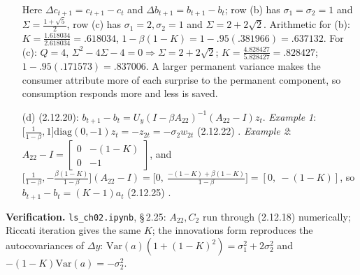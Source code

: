 \documentclass[12pt, letterpaper]{article}
\newcommand{\Var}{\mathrm{Var}}
\newcommand{\nb}[1]{\texttt{ls\_ch02.ipynb}, \S\,#1}
\begin{document}
\begin{tcolorbox}[oddbox,title={Exercise 2.25 \quad Consumption: the Two Classic Examples}]
\begin{enumerate}
\begin{center}
\begin{tabular}{@{}lcccccc@{}}
\bottomrule
\end{tabular}
\end{center}
Here $\Delta c_{t+1}=c_{t+1}-c_t$ and $\Delta b_{t+1}=b_{t+1}-b_t$; row (b) has $\sigma_1=\sigma_2=1$
and $\Sigma=\frac{1+\sqrt5}{2}$, row (c) has $\sigma_1=2,\sigma_2=1$ and $\Sigma=2+2\sqrt2$.
Arithmetic for (b): $K=\frac{1.618034}{2.618034}=.618034$, $1-\beta(1-K)=1-.95(.381966)=.637132$. For
(c): $Q=4$, $\Sigma^2-4\Sigma-4=0\Rightarrow\Sigma=2+2\sqrt2$; $K=\frac{4.828427}{5.828427}=.828427$;
$1-.95(.171573)=.837006$. A larger permanent variance makes the consumer attribute more of each
surprise to the permanent component, so consumption responds more and less is saved.
\item[(d)] (2.12.20): $b_{t+1}-b_t=U_y(I-\beta A_{22})^{-1}(A_{22}-I)z_t$.
\emph{Example 1}: $\big[\frac1{1-\beta},1\big]\text{diag}(0,-1)z_t=-z_{2t}=-\sigma_2w_{2t}$ (2.12.22) \checkmark.
\emph{Example 2}: $A_{22}-I=\begin{bmatrix}0&-(1-K)\\0&-1\end{bmatrix}$, and
$\big[\frac1{1-\beta},-\frac{\beta(1-K)}{1-\beta}\big](A_{22}-I)=\big[0,\ \frac{-(1-K)+\beta(1-K)}{1-\beta}\big]=[0,\ -(1-K)]$,
so $b_{t+1}-b_t=(K-1)a_t$ (2.12.25) \checkmark.
\end{enumerate}

\textbf{Verification.} \nb{2.25}: $A_{22},C_2$ run through (2.12.18) numerically; Riccati iteration
gives the same $K$; the innovations form reproduces the autocovariances of $\Delta y$:
$\Var(a)(1+(1-K)^2)=\sigma_1^2+2\sigma_2^2$ and $-(1-K)\Var(a)=-\sigma_2^2$. \checkmark
\end{tcolorbox}
\end{document}
